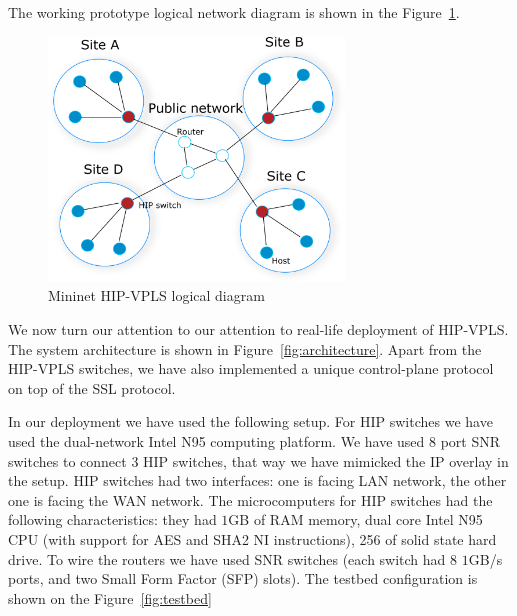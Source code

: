 The working prototype logical network diagram is shown in the Figure~\ref{fig:mininet}.

\begin{figure}[h!]
    \centering
    \includegraphics[width=0.7\textwidth]{graphics/mininet.png}
    \caption{Mininet HIP-VPLS logical diagram}
    \label{fig:mininet}
\end{figure}

We now turn our attention to our attention to real-life deployment 
of HIP-VPLS. The system architecture is shown in Figure~\ref{fig:architecture}. 
Apart from the HIP-VPLS switches, we have also implemented a unique 
control-plane protocol on top of the SSL protocol. 

In our deployment we have used the following setup. For HIP switches we 
have used the dual-network Intel N95 computing platform. We have used $8$ 
port SNR switches to connect 3 HIP switches, that way we have mimicked the 
IP overlay in the setup. HIP switches had two interfaces: one is facing 
LAN network, the other one is facing the WAN network. The microcomputers for
HIP switches had the following characteristics: they had $1$GB of RAM memory, 
dual core Intel N95 CPU (with support for AES and SHA2 NI instructions), 256 of 
solid state hard drive. To wire the routers we have used SNR switches 
(each switch had $8$ $1$GB/s ports, and two Small Form Factor (SFP) slots). 
The testbed configuration is shown on the Figure~\ref{fig:testbed}


